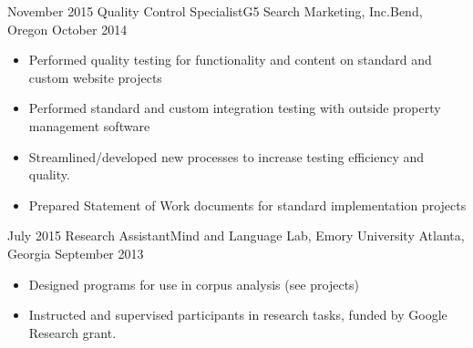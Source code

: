 \begin{experiences}
{\begin{itemize}
                      \end{itemize}
                    }
  \emptySeparator
  \experience
    {November 2015}     {Quality Control Specialist}{G5 Search Marketing, Inc.}{Bend, Oregon}
    {October 2014}    {
                      \begin{itemize}
                        \item Performed quality testing for functionality and content on standard and custom website projects 
                        \item Performed standard and custom integration testing with outside property management software
                        \item Streamlined/developed new processes to increase testing efficiency and quality.
                        \item Prepared Statement of Work documents for standard implementation projects 
                      \end{itemize}
                    }
  \emptySeparator
    \experience
    {July 2015} {Research Assistant}{Mind and Language Lab, Emory University }{Atlanta, Georgia}
    {September 2013}    {
                      \begin{itemize}
                        \item Designed programs for use in corpus analysis (see projects)
                        \item Instructed and supervised participants in research tasks, funded by Google Research grant.                
                      \end{itemize}
                    }
  \emptySeparator

\end{experiences}

